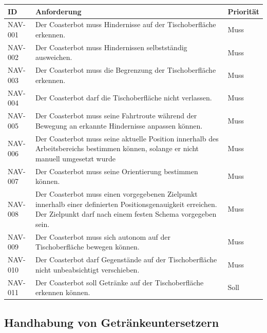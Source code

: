 \begin{longtable}[]{@{}
  >{\raggedright\arraybackslash}p{}
  >{\raggedright\arraybackslash}p{}
  >{\raggedright\arraybackslash}p{}@{}}
\toprule\noalign{}
\begin{minipage}[b]{\linewidth}\raggedright
ID
\end{minipage} & \begin{minipage}[b]{\linewidth}\raggedright
Anforderung
\end{minipage} & \begin{minipage}[b]{\linewidth}\raggedright
Priorität
\end{minipage} \\
\midrule\noalign{}
\endhead
\bottomrule\noalign{}
\endlastfoot
NAV-001 & Der Coasterbot muss Hindernisse auf der Tischoberfläche
erkennen. & Muss \\
NAV-002 & Der Coasterbot muss Hindernissen selbstständig ausweichen. &
Muss \\
NAV-003 & Der Coasterbot muss die Begrenzung der Tischoberfläche
erkennen. & Muss \\
NAV-004 & Der Coasterbot darf die Tischoberfläche nicht verlassen. &
Muss \\
NAV-005 & Der Coasterbot muss seine Fahrtroute während der Bewegung an
erkannte Hindernisse anpassen können. & Muss \\
NAV-006 & Der Coasterbot muss seine aktuelle Position innerhalb des
Arbeitsbereichs bestimmen können, solange er nicht manuell umgesetzt
wurde & Muss \\
NAV-007 & Der Coasterbot muss seine Orientierung bestimmen können. &
Muss \\
NAV-008 & Der Coasterbot muss einen vorgegebenen Zielpunkt innerhalb
einer definierten Positionsgenauigkeit erreichen. Der Zielpunkt darf
nach einem festen Schema vorgegeben sein. & Muss \\
NAV-009 & Der Coasterbot muss sich autonom auf der Tischoberfläche
bewegen können. & Muss \\
NAV-010 & Der Coasterbot darf Gegenstände auf der Tischoberfläche nicht
unbeabsichtigt verschieben. & Muss \\
NAV-011 & Der Coasterbot soll Getränke auf der Tischoberfläche erkennen
können. & Soll \\
\end{longtable}

\subsection{Handhabung von
Getränkeuntersetzern}\label{handhabung-von-getruxe4nkeuntersetzern}

